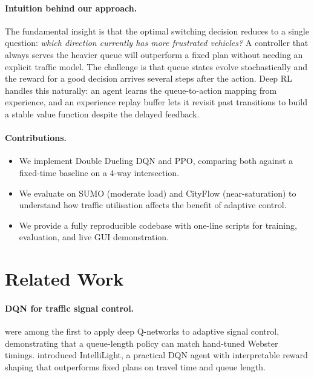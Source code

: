 \documentclass[10pt]{article}
\begin{document}
\paragraph{Intuition behind our approach.}
The fundamental insight is that the optimal switching decision reduces to a
single question: \emph{which direction currently has more frustrated vehicles?}
A controller that always serves the heavier queue will outperform a fixed plan
without needing an explicit traffic model.  The challenge is that queue states
evolve stochastically and the reward for a good decision arrives several steps
after the action.  Deep RL handles this naturally: an agent learns the
queue-to-action mapping from experience, and an experience replay buffer
lets it revisit past transitions to build a stable value function despite
the delayed feedback.

\paragraph{Contributions.}
\begin{itemize}
  \item We implement Double Dueling DQN and PPO, comparing both against a
        fixed-time baseline on a 4-way intersection.
  \item We evaluate on SUMO (moderate load) and CityFlow (near-saturation)
        to understand how traffic utilisation affects the benefit of adaptive control.
  \item We provide a fully reproducible codebase with one-line scripts for
        training, evaluation, and live GUI demonstration.
\end{itemize}

\section{Related Work}

\paragraph{DQN for traffic signal control.}
\citet{li2016traffic} were among the first to apply deep Q-networks to adaptive
signal control, demonstrating that a queue-length policy can match hand-tuned
Webster timings.  \citet{wei2018intellilight} introduced IntelliLight, a
practical DQN agent with interpretable reward shaping that outperforms fixed
plans on travel time and queue length.
\end{document}

